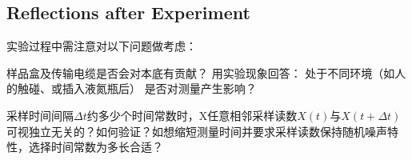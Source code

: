 

\subsection{Reflections after Experiment}
实验过程中需注意对以下问题做考虑：

\begin{question}
	样品盒及传输电缆是否会对本底有贡献？ 用实验现象回答： 处于不同环境（如人的触碰、或插入液氮瓶后） 是否对测量产生影响？
\end{question}

\begin{question}
	采样时间间隔$\Delta t$约多少个时间常数时，X任意相邻采样读数$X(t)$与$X(t+\Delta t)$可视独立无关的？如何验证？如想缩短测量时间并要求采样读数保持随机噪声特性，选择时间常数为多长合适？
\end{question}

